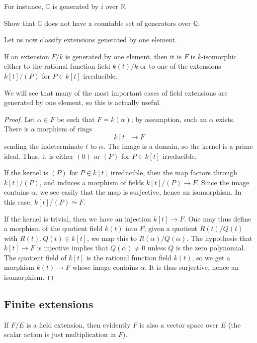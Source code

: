 For instance, $\mathbb{C}$ is generated by $i$ over $\mathbb{R}$.

\begin{exercise} 
Show that $\mathbb{C}$ does not have a countable set of generators over
$\mathbb{Q}$.
\end{exercise} 


Let us now classify extensions generated by one element.
\begin{proposition} \label{fldmono} 
If an extension $F/k$ is generated by one element, then it is $F$ is $k$-isomorphic
either to the rational function field $k(t)/k$ or to one of the extensions
$k[t]/(P)$ for $P \in k[t]$ irreducible.
\end{proposition} 

We will see that many of the most important cases of field extensions are generated 
by one element, so this is actually useful. 

\begin{proof} 
Let $\alpha \in F$ be such that $F = k(\alpha)$; by assumption, such an
$\alpha$ exists. 
There is a morphism of rings
\[ k[t] \to F  \]
sending the indeterminate $t$ to $\alpha$. The image is a domain, so the
kernel is a prime ideal. Thus, it is either $(0)$ or $(P)$ for $P \in k[t]$
irreducible.

If the kernel is $(P)$ for $P \in k[t]$ irreducible, then the map factors
through $k[t]/(P)$, and induces a morphism of fields $k[t]/(P) \to F$. Since
the image contains $\alpha$, we see easily that the map is surjective, hence
an isomorphism. In this case, $k[t]/(P) \simeq F$.

If the kernel is trivial, then we have an injection 
$k[t] \to F$. 
One may thus define a morphism of the quotient field $k(t)$ into $F$; given a
quotient $R(t)/Q(t)$ with $R(t), Q(t) \in k[t]$, we map this to
$R(\alpha)/Q(\alpha)$. The hypothesis that $k[t] \to F$ is injective implies
that $Q(\alpha) \neq 0$ unless $Q$ is the zero polynomial. 
The quotient field of $k[t]$ is the rational function field $k(t)$, so we get a  morphism $k(t) \to F$
whose image contains $\alpha$. It is thus surjective, hence an isomorphism.
\end{proof}




\subsection{Finite extensions}
If
$F/E$ is a field extension,  then evidently  $F$ is also a vector space over $E$
(the scalar action is just multiplication in $F$). 

